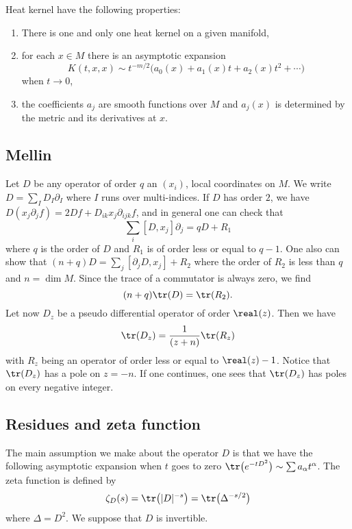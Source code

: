 \begin{theorem}
Heat kernel have the following properties:
\begin{enumerate}
\item There is one and only one heat kernel on a given manifold,
\item for each $x\in M$ there is an asymptotic expansion
\[ 
  K(t,x,x)\sim t^{-m/2}\big( a_0(x)+a_1(x)t+a_2(x)t^2+\cdots \big)
\]
when $t\to 0$,
\item the coefficients $a_j$ are smooth functions over $M$ and $a_j(x)$ is determined by the metric and its derivatives at $x$.
\end{enumerate}
\end{theorem}

\subsection{Mellin}


Let $D$ be any operator of order $q$ an $(x_i)$, local coordinates on $M$. We write $D=\sum_ID_I\partial_I$ where $I$ runs over multi-indices. If $D$ has order $2$, we have $D(x_j\partial_jf)=2Df+D_{ik}x_j\partial_{ijk}f$, and in general one can check that
\[ 
 \sum_i[D,x_j]\partial_j=qD+R_1
\]
where $q$ is the order of $D$ and $R_1$ is of order less or equal to $q-1$. One also can show that $(n+q)D=\sum_j[\partial_jD,x_j]+R_2$ where the order of $R_2$ is less than $q$ and $n=\dim M$. Since the trace of a commutator is always zero, we find
\begin{equation}
(n+q)\tr(D)=\tr(R_2).
\end{equation}
Let now $D_z$ be a pseudo differential operator of order $\real(z)$. Then we have
\[ 
  \tr(D_z)=\frac{1}{ (z+n) }\tr(R_z)
\]
with $R_z$ being an operator of order less or equal to $\real(z)-1$. Notice that $\tr(D_z)$ has a pole on $z=-n$. If one continues, one sees that $\tr(D_z)$ has poles on every negative integer.


\subsection{Residues and zeta function}

The main assumption we make about the operator $D$ is that we have the following asymptotic expansion when $t$ goes to zero $\tr\big( e^{-tD^2}\big)\sim \sum a_{\alpha}t^{\alpha}$. The zeta function is defined by 
\begin{equation}
\zeta_D(s)=\tr\big( | D |^{-s} \big)=\tr\big( \Delta^{-s/2} \big)
\end{equation}
where $\Delta=D^2$. We suppose that $D$ is invertible.

